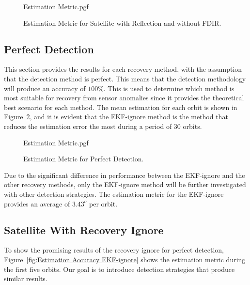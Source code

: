 \documentclass[letterpaper, 10 pt, conference]{ieeeconf}  %
\begin{document}
\begin{figure}[!htb]
	\begin{center}
		{Estimation Metric.pgf}
	\end{center}
	\caption[Estimation Metric for Satellite with Reflection and without FDIR]{Estimation Metric for Satellite with Reflection and without FDIR.}
	\label{fig:Estimation Accuracy Reflection}
\end{figure}

\subsection{Perfect Detection}
This section provides the results for each recovery method, with the assumption that the detection method is perfect. This means that the detection methodology will produce an accuracy of $100\%$. This is used to determine which method is most suitable for recovery from sensor anomalies since it provides the theoretical best scenario for each method. The mean estimation for each orbit is shown in Figure~\ref{fig:Estimation Metric Summary}, and it is evident that the EKF-ignore method is the method that reduces the estimation error the most during a period of $30$ orbits. 

\begin{figure}[!htb]
	\begin{center}
		{Estimation Metric.pgf}
	\end{center}
	\caption[Estimation Metric for Perfect Detection]{Estimation Metric for Perfect Detection.}
	\label{fig:Estimation Metric Summary}
\end{figure}

Due to the significant difference in performance between the EKF-ignore and the other recovery methods, only the EKF-ignore method will be further investigated with other detection strategies. The estimation metric for the EKF-ignore provides an average of $3.43^o$ per orbit.

\subsection{Satellite With Recovery Ignore}
To show the promising results of the recovery ignore for perfect detection, Figure~\ref{fig:Estimation Accuracy EKF-ignore} shows the estimation metric during the first five orbits. Our goal is to introduce detection strategies that produce similar results.
\end{document}
